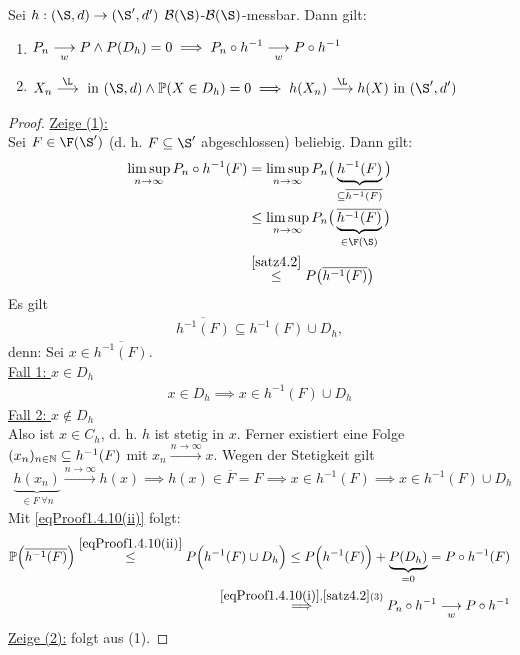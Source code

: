 \begin{satz}\enter\label{satz4.10ContinuousMappingTheorem}
Sei $h:(\S,d)\to(\S',d')$ $\B(\S)$-$\B(\S)$-messbar. Dann gilt:
\begin{enumerate}[label=(\arabic*)]
\item $\begin{aligned}
P_n\underset{w}{\overset{}{\longrightarrow}} P\wedge P(D_h)=0
\implies P_n\circ h^{-1}\underset{w}{\overset{}{\longrightarrow}} P\circ h^{-1}
\end{aligned}$
\item $\begin{aligned}
X_n\stackrel{\L}{\longrightarrow}\text{ in }(\S,d)\wedge\P(X\in D_h)=0
\implies h(X_n)\stackrel{\L}{\longrightarrow} h(X)\text{ in }(\S',d') 
\end{aligned}$
\end{enumerate}
\end{satz}
\begin{proof}
\underline{Zeige (1):}\\
Sei $F\in\F(\S')$ (d. h. $F\subseteq\S'$ abgeschlossen) beliebig. Dann gilt:
\begin{align}\label{eqProof1.4.10(i)}
\limsup\limits_{n\to\infty} P_n\circ h^{-1}(F)
&=\limsup\limits_{n\to\infty} P_n\big(\underbrace{h^{-1}(F)}_{\subseteq \overline{h^{-1}(F)}}\big)\\\nonumber
&\leq \limsup\limits_{n\to\infty} P_n\big(\underbrace{\overline{h^{-1}(F)}}_{\in\F(\S)}\big)\\\nonumber
&\stackrel{\ref{satz4.2}}{\leq}
P\big(\overline{h^{-1}(F)}\big)
\end{align}
Es gilt
\begin{align}\label{eqProof1.4.10(ii)}
\overline{h^{-1}(F)}\subseteq h^{-1}(F)\cup D_h,
\end{align}
denn: Sei $x\in\overline{h^{-1}(F)}$.\\

\underline{Fall 1: $x\in D_h$}
\begin{align*}
x\in D_h\implies x\in h^{-1}(F)\cup D_h
\end{align*}
\underline{Fall 2: $x\not\in D_h$}\\
Also ist $x\in C_h$, d. h. $h$ ist stetig in $x$. Ferner existiert eine Folge $(x_n)_{n\in\mathbb{N}}\subseteq h^{-1}(F)$ mit $x_n\stackrel{n\to\infty}{\longrightarrow} x$. Wegen der Stetigkeit gilt
\begin{align*}
\underbrace{h(x_n)}_{\in F~\forall n}\stackrel{n\to\infty}{\longrightarrow} h(x)
\implies h(x)\in\overline{F}=F\implies x\in h^{-1}(F)
\implies x\in h^{-1}(F)\cup D_h
\end{align*}
Mit \eqref{eqProof1.4.10(ii)} folgt:
\begin{align*}
\mathbb{P}\Big(\overline{h^{-1}(F)}\Big)
\stackrel{\eqref{eqProof1.4.10(ii)}}{\leq}
P\Big(h^{-1}(F)\cup D_h\Big)
\leq P\Big(h^{-1}(F)\Big)+\underbrace{P(D_h)}_{=0}
=P\circ h^{-1}(F)\\
\stackrel{\eqref{eqProof1.4.10(i)},\ref{satz4.2}(3)}{\implies} 
P_n\circ h^{-1}\underset{w}{\overset{}{\longrightarrow}} P\circ h^{-1}
\end{align*}
\underline{Zeige (2):} folgt aus (1).
\end{proof}


